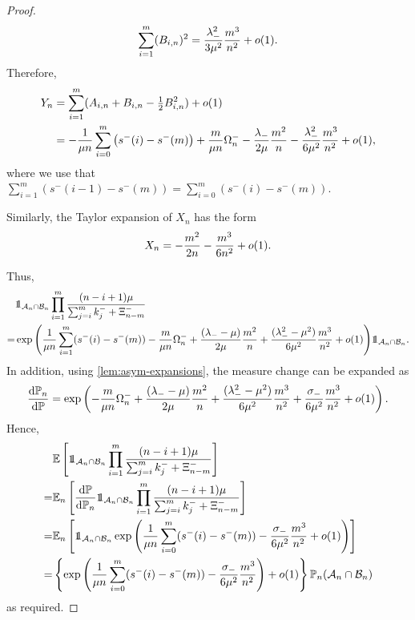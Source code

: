 \begin{proof}
\begin{equation*}
        \sum_{i=1}^m (B_{i,n})^2 = \frac{\lambda_-^2}{3 \mu^2} \frac{m^3}{n^2} + o(1).
    \end{equation*}
    Therefore,
    \begin{align*}
        Y_n
        &= \sum_{i=1}^m (A_{i, n} + B_{i, n} - \tfrac{1}{2} B_{i, n}^2) + o(1) \\
        &= - \frac{1}{\mu n} \sum_{i=0}^m \left( s^-(i) - s^-(m) \right)
        + \frac{m}{\mu n} \Omega_n^-
        - \frac{\lambda_-}{2\mu} \frac{m^2}{n} - \frac{\lambda_-^2}{6 \mu^2} \frac{m^3}{n^2} + o(1),
    \end{align*}
    where we use that $\sum_{i=1}^m \left( s^-(i-1) - s^-(m) \right) = \sum_{i=0}^m \left( s^-(i) - s^-(m) \right)$.

    Similarly, the Taylor expansion of $X_n$ has the form
    \begin{equation*}
        X_n = - \frac{m^2}{2 n} - \frac{m^3}{6n^2} + o(1).
    \end{equation*}

    Thus,
    \begin{align*}
        &\one_{\lltEvent_n \cap \omegaEvent_n} \prod_{i=1}^m \frac{(n-i+1)\mu}{\sum_{j=i}^m k_j^- + \Xi^-_{n-m}} \\
        = &\exp \Bigg( \frac{1}{\mu n} \sum_{i=1}^m (s^-(i) - s^-(m)) \nonumber
         - \frac{m}{\mu n} \Omega^-_n + \frac{(\lambda_- - \mu)}{2 \mu} \frac{m^2}{n} + \frac{(\lambda_-^2 - \mu^2)}{6 \mu^2} \frac{m^3}{n^2} + \littleo(1) \Bigg) \one_{\lltEvent_n \cap \omegaEvent_n}.
    \end{align*}
    In addition, using \cref{lem:asym-expansions}, the measure change can be expanded as
    \begin{equation*}
        \frac{\mathrm{d}{\mathbb P}_n}{\mathrm{d}{\mathbb P}} = \exp \left( 
            - \frac{m}{\mu n} \Omega_n^- + \frac{(\lambda_- - \mu)}{2\mu} \frac{m^2}{n}
            + \frac{(\lambda_-^2 - \mu^2)}{6 \mu^2} \frac{m^3}{n^2} + \frac{\sigma_-}{6 \mu^2} \frac{m^3}{n^2} + o(1)
        \right).
    \end{equation*}
    Hence,
    \begin{align*}
        &\E\left[ 
            \one_{\lltEvent_n \cap \omegaEvent_n}
            \prod_{i=1}^m \frac{(n-i+1)\mu}{\sum_{j=i}^m k^-_j + \Xi^-_{n-m}}
        \right] \\
        =& \E_n\left[ 
            \frac{\dif \P}{\dif \P_n}
            \one_{\lltEvent_n \cap \omegaEvent_n}
            \prod_{i=1}^m \frac{(n-i+1)\mu}{\sum_{j=i}^m k^-_j + \Xi^-_{n-m}}
        \right] \\
        =& \E_n \left[ 
            \one_{\lltEvent_n \cap \omegaEvent_n}
            \exp \left( 
                \frac{1}{\mu n} \sum_{i=0}^m (s^-(i) - s^-(m)) - \frac{\sigma_-}{6 \mu^2} \frac{m^3}{n^2} + \littleo(1)
            \right)
        \right] \\
        =& \left\{  
            \exp \left( 
                \frac{1}{\mu n} \sum_{i=0}^m (s^-(i) - s^-(m)) - \frac{\sigma_-}{6 \mu^2} \frac{m^3}{n^2}
            \right) + \littleo(1)
         \right\} \P_n(\lltEvent_n \cap \omegaEvent_n)
    \end{align*}
    as required.
\end{proof}

